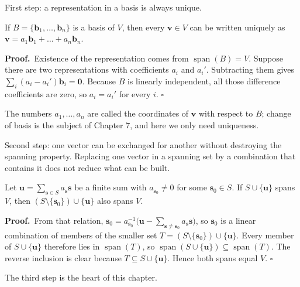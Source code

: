 First step: a representation in a basis is always unique.

\begin{lemma}
If $B=\{\mathbf{b}_{1},\dots,\mathbf{b}_{n}\}$ is a basis of $V$, then every $\mathbf{v}\in V$
can be written uniquely as $\mathbf{v}=a_{1}\mathbf{b}_{1}+\dots+a_{n}\mathbf{b}_{n}$.
\end{lemma}

\par\medskip\noindent\textbf{Proof.}\ 
Existence of the representation comes from $\operatorname{span}(B)=V$. Suppose there are two
representations with coefficients $a_{i}$ and $a_{i}'$. Subtracting them gives
$\sum_{i}(a_{i}-a_{i}')\mathbf{b}_{i}=\mathbf{0}$. Because $B$ is linearly independent, all those
difference coefficients are zero, so $a_{i}=a_{i}'$ for every $i$.
\hfill$\square$\par\medskip

The numbers $a_{1},\dots,a_{n}$ are called the coordinates of $\mathbf{v}$ with respect to $B$;
change of basis is the subject of Chapter 7, and here we only need uniqueness.

Second step: one vector can be exchanged for another without destroying the spanning property.
Replacing one vector in a spanning set by a combination that contains it does not reduce what can
be built.

\begin{lemma}[Exchange]
Let $\mathbf{u}=\sum_{\mathbf{s}\in S}a_{\mathbf{s}}\mathbf{s}$ be a finite sum with
$a_{\mathbf{s}_{0}}\neq 0$ for some $\mathbf{s}_{0}\in S$. If $S\cup\{\mathbf{u}\}$
spans $V$, then $(S\setminus\{\mathbf{s}_{0}\})\cup\{\mathbf{u}\}$ also spans $V$.
\end{lemma}

\par\medskip\noindent\textbf{Proof.}\ 
From that relation,
$\mathbf{s}_{0}=a_{\mathbf{s}_{0}}^{-1}\bigl(\mathbf{u}-\sum_{\mathbf{s}\neq\mathbf{s}_{0}}a_{\mathbf{s}}\mathbf{s}\bigr)$,
so $\mathbf{s}_{0}$ is a linear combination of members of the smaller set
$T=(S\setminus\{\mathbf{s}_{0}\})\cup\{\mathbf{u}\}$. Every member of $S\cup\{\mathbf{u}\}$
therefore lies in $\operatorname{span}(T)$, so
$\operatorname{span}(S\cup\{\mathbf{u}\})\subseteq\operatorname{span}(T)$. The reverse inclusion
is clear because $T\subseteq S\cup\{\mathbf{u}\}$. Hence both spans equal $V$.
\hfill$\square$\par\medskip

The third step is the heart of this chapter.

